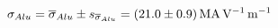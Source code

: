 
\begin{equation}
    \sigma_{Alu}
        = \overline{\sigma}_{Alu} \pm s_{\overline{\sigma}_{Alu}}
        = \SI[separate-uncertainty = true]{21.0 \pm 0.9 }{\mega\ampere\per\volt\per\meter}
\end{equation}
